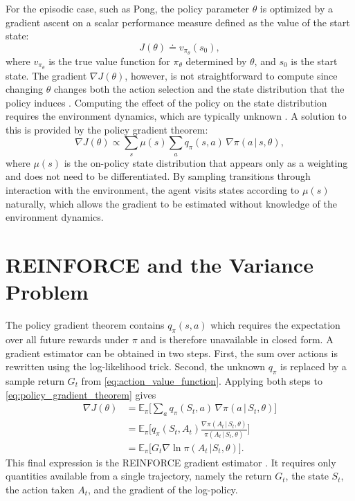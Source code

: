 For the episodic case, such as Pong, the policy parameter $\theta$ is optimized by a gradient ascent on a scalar performance measure defined as the value of the start state:
\begin{equation}
	J(\theta) \doteq v_{\pi_{\theta}}(s_0),
\end{equation}
where $v_{\pi_{\theta}}$ is the true value function for $\pi_{\theta}$ determined by $\theta$, and $s_0$ is the start state. The gradient $\nabla J(\theta)$, however, is not straightforward to compute since changing $\theta$ changes both the action selection and the state distribution that the policy induces \citep[p.~324]{suttonReinforcementLearningIntroduction2020}. Computing the effect of the policy on the state distribution requires the environment dynamics, which are typically unknown \citep[p.~325]{suttonReinforcementLearningIntroduction2020}. A solution to this is provided by the policy gradient theorem:
\begin{equation}\label{eq:policy_gradient_theorem}
	\nabla J(\theta) \propto \sum_s \mu(s) \sum_a q_\pi(s, a)\,\nabla \pi(a\,|\,s, \theta),
\end{equation}
where $\mu(s)$ is the on-policy state distribution that appears only as a weighting and does not need to be differentiated. By sampling transitions through interaction with the environment, the agent visits states according to $\mu(s)$ naturally, which allows the gradient to be estimated without knowledge of the environment dynamics.

\section{REINFORCE and the Variance Problem}
The policy gradient theorem contains $ q_\pi(s, a)$ which requires the expectation over all future rewards under $\pi$ and is therefore unavailable in closed form. A gradient estimator can be obtained in two steps. First, the sum over actions is rewritten using the log-likelihood trick. Second, the unknown $q_\pi$ is replaced by a sample return $G_t$ from \eqref{eq:action_value_function}. Applying both steps to \eqref{eq:policy_gradient_theorem} gives
\begin{align}
	\nabla J(\theta) &= \mathbb{E}_\pi \bigg[\sum_a q_\pi(S_t, a)\,\nabla \pi(a\,|\,S_t, \theta)\bigg] \nonumber \\
	&= \mathbb{E}_\pi \bigg[q_\pi(S_t, A_t) \frac{\nabla \pi(A_t\,|\,S_t, \theta)}{\pi(A_t\,|\,S_t, \theta)} \bigg] \nonumber \\
	&=  \mathbb{E}_\pi \bigg[G_t \nabla \ln \pi(A_t\,|S_t, \theta) \bigg].
\end{align}
This final expression is the REINFORCE gradient estimator \citep[p.~327]{williamsSimpleStatisticalGradientfollowing1992, suttonReinforcementLearningIntroduction2020}. It requires only quantities available from a single trajectory, namely the return $G_t$, the state $S_t$, the action taken $A_t$, and the gradient of the log-policy.

